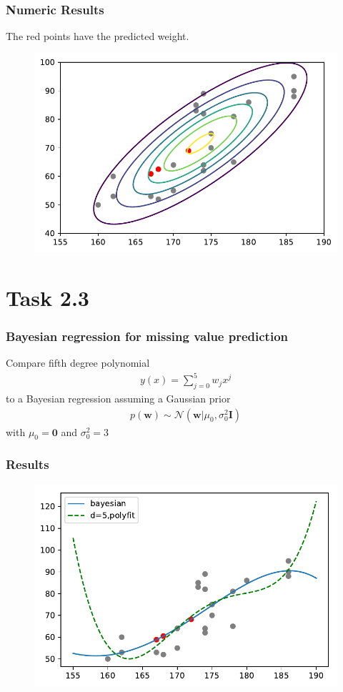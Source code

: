 \documentclass{beamer}
\begin{document}
\begin{frame}
	\frametitle{Numeric Results}
	The red points have the predicted weight.
	\begin{figure}
		\includegraphics[width=0.9\linewidth]{graphics/contours}
	\end{figure}
\end{frame}

\section{Task 2.3}

\begin{frame}
	\frametitle{Bayesian regression for missing value prediction}
	Compare fifth degree polynomial
	\begin{align*}
		y(x) = \sum_{j=0}^{5}w_jx^j
	\end{align*}
	to a Bayesian regression assuming a Gaussian prior
	\begin{align*}
		p(\mathbf{w}) \sim \mathcal{N}(\mathbf{w}|\mu_0,\sigma^2_0\mathbf{I})
	\end{align*}
	with $\mu_0=\mathbf{0}$ and $\sigma^2_0=3$
	
\end{frame}

\begin{frame}
	\frametitle{Results}
	\begin{figure}
		\includegraphics[height=0.85\textheight]{graphics/task3}
	\end{figure}
\end{frame}
\end{document}
